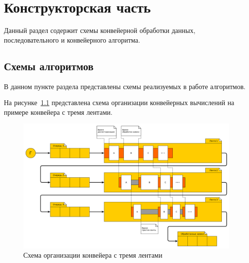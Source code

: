 \documentclass[a4paper,oneside,14pt]{extreport}
\begin{document}
\newpage

\chapter{Конструкторская часть}
Данный раздел содержит схемы конвейерной обработки данных, последовательного и конвейерного алгоритма.

\section{Схемы алгоритмов}
В данном пункте раздела представлены схемы реализуемых в работе алгоритмов.

На рисунке~\ref{img:conveer} представлена схема организации конвейерных вычислений на примере конвейера с тремя лентами.
\begin{figure}[H]
	\centering
	\includegraphics[width=1.00\linewidth]{images/conveer}
	\caption{Схема организации конвейера с тремя лентами}
	\label{img:conveer}
\end{figure}
%
%
%
%
%
\end{document}
